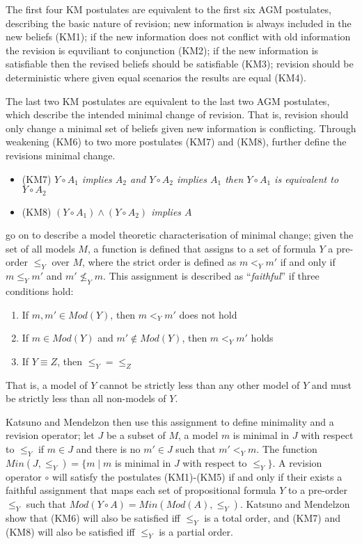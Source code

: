 The first four KM postulates are equivalent to the first six AGM postulates, describing the basic nature of revision;
new information is always included in the new beliefs (KM1); if the new information does not conflict with old information the revision is equviliant to conjunction (KM2);
if the new information is satisfiable then the revised beliefs should be satisfiable (KM3); revision should be deterministic where given equal scenarios the results are equal (KM4).

The last two KM postulates are equivalent to the last two AGM postulates, which describe the intended minimal change of revision.
That is, revision should only change a minimal set of beliefs given new information is conflicting.
Through weakening (KM6) to two more postulates (KM7) and (KM8), \cite{katsuno1991propositional} further define the revisions minimal change.

\begin{itemize}
  \item (KM7) \textit{ $Y \circ A_1$  implies $A_2$ and $Y \circ A_2$ implies $A_1$ then $Y \circ A_1$ is equivalent to $Y \circ A_2$}
  \item (KM8) \textit{ $(Y \circ A_1) \wedge (Y \circ A_2)$ implies $A$}
\end{itemize}

\cite{katsuno1991propositional} go on to describe a model theoretic characterisation of minimal change; 
given the set of all models $M$, a function is defined that assigns to a set of formula $Y$ a pre-order $\leq_{Y}$ over $M$,
where the strict order is defined as $m <_Y m'$ if and only if $m \leq_Y m'$ and $m' \not \leq_Y m$. 
This assignment is described as ``\textit{faithful}'' if three conditions hold:
\begin{enumerate}
  \item If $m,m' \in Mod(Y)$, then $m <_Y m'$ does not hold
  \item If $m \in Mod(Y)$ and $m' \not\in Mod(Y)$, then $m <_Y m'$ holds
  \item If $Y \equiv Z$, then $\leq_Y = \leq_Z$  
\end{enumerate}

That is, a model of $Y$ cannot be strictly less than any other model of $Y$ and must be strictly less than all non-models of $Y$.

Katsuno and Mendelzon then use this assignment to define minimality and a revision operator; 
let $J$ be a subset of $M$, 
a model $m$ is minimal in $J$ with respect to $\leq_{Y}$ if $m \in J$ and there is no $m' \in J$ such that $m' <_Y m$. 
The function $Min(J,\leq_{Y}) = \{ m \mid m$ is minimal in $J$ with respect to $\leq_{Y} \}$.
A revision operator $\circ$ will satisfy the postulates (KM1)-(KM5) if and only if
their exists a faithful assignment that maps each set of propositional formula $Y$ to a pre-order $\leq_{Y}$
such that $Mod(Y \circ A) = Min(Mod(A),\leq_{Y})$.
Katsuno and Mendelzon show that (KM6) will also be satisfied iff $\leq_{Y}$ is a total order,
and (KM7) and (KM8) will also be satisfied iff $\leq_{Y}$ is a partial order.

